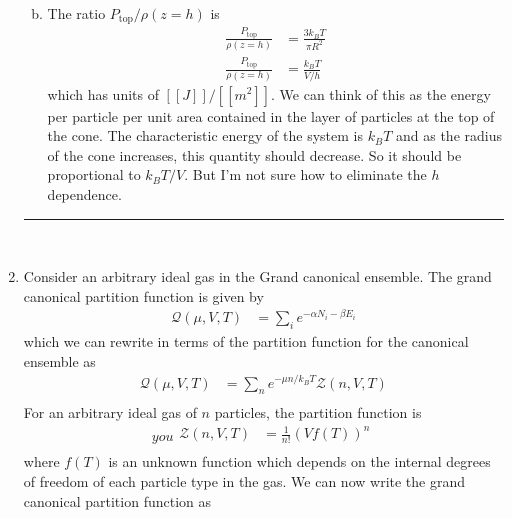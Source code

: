 \documentclass[]{book}
\begin{document}
\begin{enumerate}[1)]
\begin{enumerate}[a)]
\begin{equation}
\begin{split}
\end{split}
\end{equation}
\item The ratio $P_{\text{top}}/ \rho(z=h)$ is
\begin{equation}
\begin{split}
\frac{P_{\text{top}}}{ \rho(z=h)} & = \frac{3k_BT}{\pi R^2} \\
\frac{P_{\text{top}}}{ \rho(z=h)} & = \frac{k_BT}{V/h} 
\end{split}
\end{equation}
which has units of $[[J]]/[[m^2]]$. We can think of this as the energy per particle per unit area contained in the layer of particles at the top of the cone. The characteristic energy of the system is $k_BT$ and as the radius of the cone increases, this quantity should decrease. So it should be proportional to $k_BT/V$. But I'm not sure how to eliminate the $h$ dependence.  
\end{enumerate}
\noindent\rule{15cm}{0.4pt} \\
\item Consider an arbitrary ideal gas in the Grand canonical ensemble. The grand canonical partition function is given by 
\begin{equation}
\begin{split}
\mathcal{Q}(\mu, V, T) & = \sum_{i} e^{-\alpha N_i - \beta E_i}
\end{split}
\end{equation}
which we can rewrite in terms of the partition function for the canonical ensemble as
\begin{equation}
\begin{split}
\mathcal{Q}(\mu, V, T) & = \sum_{n} e^{-\mu n/k_BT} \mathcal{Z}(n, V,T) \\
\end{split}
\end{equation}
For an arbitrary ideal gas of $n$ particles, the partition function is
\begin{equation} you 
\begin{split}
\mathcal{Z}(n, V,T) & = \frac{1}{n!}\left( V f(T)\right)^n \\
\end{split}
\end{equation}
where $f(T)$ is an unknown function which depends on the internal degrees of freedom of each particle type in the gas. We can now write the grand canonical partition function as
\begin{equation}
\begin{split}

\end{split}
\end{equation}
\end{enumerate}
\end{document}
